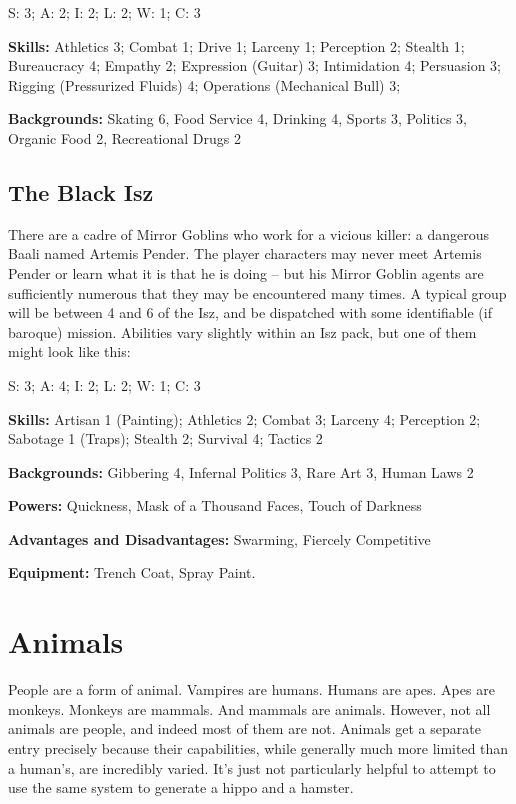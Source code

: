 S: 3; A: 2; I: 2; L: 2; W: 1; C: 3

\textbf{Skills:} Athletics 3; Combat 1; Drive 1; Larceny 1; Perception 2; Stealth 1;
Bureaucracy 4; Empathy 2; Expression (Guitar) 3; Intimidation 4; Persuasion 3;
Rigging (Pressurized Fluids) 4; Operations (Mechanical Bull) 3;

\textbf{Backgrounds:} Skating 6, Food Service 4, Drinking 4, Sports 3, Politics 3, Organic Food 2, Recreational Drugs 2

\subsection{The Black Isz}
\hspace{\parindent} There are a cadre of Mirror Goblins who work for a vicious killer: a dangerous Baali named Artemis Pender. The player characters may never meet Artemis Pender or learn what it is that he is doing -- but his Mirror Goblin agents are sufficiently numerous that they may be encountered many times. A typical group will be between 4 and 6 of the Isz, and be dispatched with some identifiable (if baroque) mission. Abilities vary slightly within an Isz pack, but one of them might look like this:

S: 3; A: 4; I: 2; L: 2; W: 1; C: 3

\textbf{Skills:} Artisan 1 (Painting); Athletics 2; Combat 3; Larceny 4; Perception 2; Sabotage 1 (Traps); Stealth 2; Survival 4; Tactics 2

\textbf{Backgrounds:} Gibbering 4, Infernal Politics 3, Rare Art 3, Human Laws 2

\textbf{Powers:} Quickness, Mask of a Thousand Faces, Touch of Darkness

\textbf{Advantages and Disadvantages:} Swarming, Fiercely Competitive

\textbf{Equipment:} Trench Coat, Spray Paint.

\section{Animals}

People are a form of animal. Vampires are humans. Humans are apes. Apes are monkeys. Monkeys are mammals. And mammals are animals. However, not all animals are people, and indeed most of them are not. Animals get a separate entry precisely because their capabilities, while generally much more limited than a human's, are incredibly varied. It's just not particularly helpful to attempt to use the same system to generate a hippo and a hamster.

